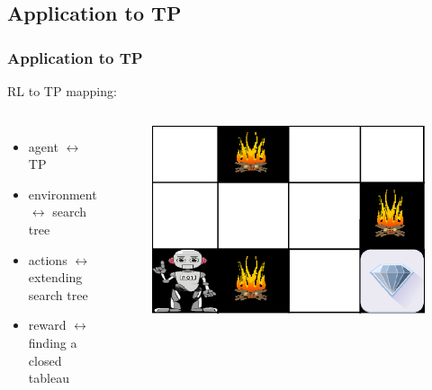 \documentclass{beamer}
\begin{document}
\subsection{Application to TP}
\begin{frame}
    \frametitle{Application to TP}
    RL to TP mapping:
    \begin{columns}
    \begin{itemize}
        \item agent $\leftrightarrow$ TP
        \item environment $\leftrightarrow$ search tree
        \item actions $\leftrightarrow$ extending search tree
        \item reward $\leftrightarrow$ finding a closed tableau
    \end{itemize}
    \begin{figure}
    \includegraphics[width=\linewidth]{RL_robot.png}
    \end{figure}
    \end{columns}
\end{frame}
\end{document}
